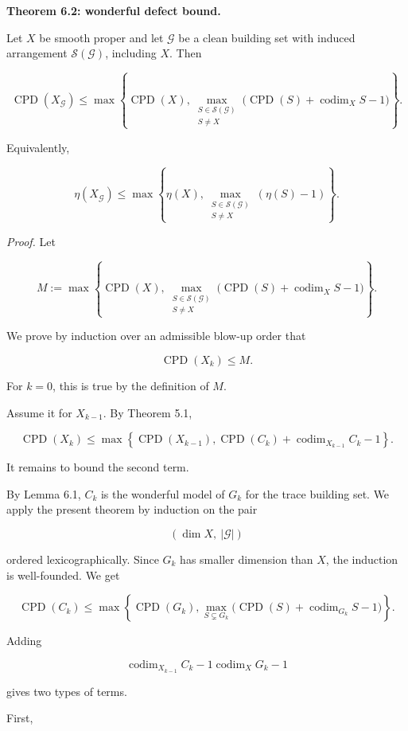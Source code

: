 \documentclass[11pt]{amsart}
\theoremstyle{definition}
\begin{document}
\noindent\textbf{Theorem 6.2: wonderful defect bound.}

Let $X$ be smooth proper and let $\mathcal G$ be a clean building set with induced arrangement $\mathcal S(\mathcal G)$, including $X$. Then

\[
\operatorname{CPD}(X_{\mathcal G})
\le
\max\left\{
\operatorname{CPD}(X),
\max_{\substack{S\in\mathcal S(\mathcal G)\\ S\ne X}}
\bigl(
\operatorname{CPD}(S)+\operatorname{codim}_XS-1
\bigr)
\right\}.
\]

Equivalently,

\[
\eta(X_{\mathcal G})
\le
\max\left\{
\eta(X),
\max_{\substack{S\in\mathcal S(\mathcal G)\\ S\ne X}}
(\eta(S)-1)
\right\}.
\]

\noindent\emph{Proof.} Let

\[
M:=
\max\left\{
\operatorname{CPD}(X),
\max_{\substack{S\in\mathcal S(\mathcal G)\\ S\ne X}}
\bigl(
\operatorname{CPD}(S)+\operatorname{codim}_XS-1
\bigr)
\right\}.
\]

We prove by induction over an admissible blow-up order that

\[
\operatorname{CPD}(X_k)\le M.
\]

For $k=0$, this is true by the definition of $M$.

Assume it for $X_{k-1}$. By Theorem 5.1,

\[
\operatorname{CPD}(X_k)
\le
\max\left\{
\operatorname{CPD}(X_{k-1}),
\operatorname{CPD}(C_k)+
\operatorname{codim}_{X_{k-1}}C_k-1
\right\}.
\]

It remains to bound the second term.

By Lemma 6.1, $C_k$ is the wonderful model of $G_k$ for the trace building set. We apply the present theorem by induction on the pair

\[
(\dim X,\ |\mathcal G|)
\]

ordered lexicographically. Since $G_k$ has smaller dimension than $X$, the induction is well-founded. We get

\[
\operatorname{CPD}(C_k)
\le
\max\left\{
\operatorname{CPD}(G_k),
\max_{S\subsetneq G_k}
\bigl(
\operatorname{CPD}(S)+\operatorname{codim}_{G_k}S-1
\bigr)
\right\}.
\]

Adding

\[
\operatorname{codim}_{X_{k-1}}C_k-1
\operatorname{codim}_XG_k-1
\]

gives two types of terms.

First,
\end{document}
